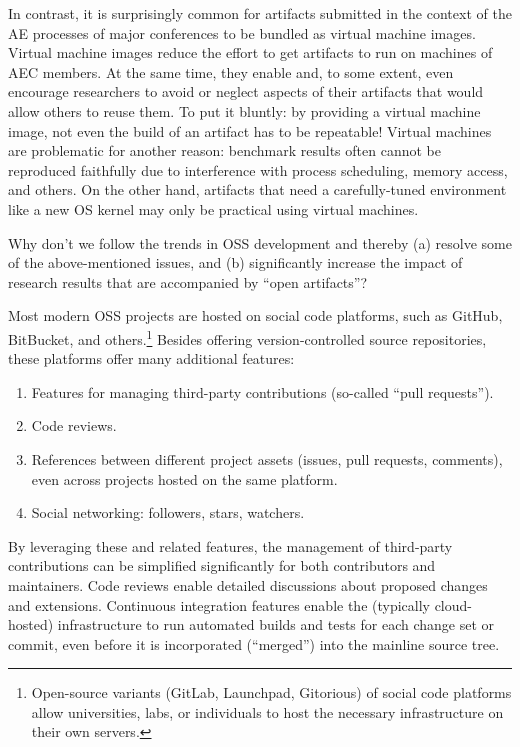 \documentclass{sigplanconf}
\begin{document}
In contrast, it is surprisingly common for artifacts submitted in the context
of the AE processes of major conferences to be bundled as virtual machine
images. Virtual machine images reduce the effort to get artifacts to run on
machines of AEC members. At the same time, they enable and, to some extent,
even encourage researchers to avoid or neglect aspects of their artifacts that
would allow others to reuse them. To put it bluntly: by providing a virtual
machine image, not even the build of an artifact has to be repeatable! Virtual
machines are problematic for another reason: benchmark results often cannot be
reproduced faithfully due to interference with process scheduling, memory
access, and others. On the other hand, artifacts that need a carefully-tuned
environment like a new OS kernel may only be practical using virtual machines.

Why don't we follow the trends in OSS development and thereby (a) resolve some
of the above-mentioned issues, and (b) significantly increase the impact of
research results that are accompanied by ``open artifacts''?

Most modern OSS projects are hosted on social code platforms, such as GitHub,
BitBucket, and others.\footnote{Open-source variants
(GitLab, Launchpad, Gitorious) of social code platforms allow universities,
labs, or individuals to host the necessary infrastructure on their own
servers.} Besides offering version-controlled source repositories, these
platforms offer many additional features:

\begin{enumerate}

\item Features for managing third-party
contributions (so-called ``pull requests'').

\item Code reviews.

\item References between different project assets (issues, pull
requests, comments), even across projects hosted on the same platform.

\item Social networking: followers, stars, watchers.

\end{enumerate}

By leveraging these and related features, the management of third-party
contributions can be simplified significantly for both contributors and
maintainers. Code reviews enable detailed discussions about proposed changes
and extensions. Continuous integration features enable the (typically cloud-hosted)
infrastructure to run automated builds and tests for each change set
or commit, even before it is incorporated (``merged'') into the mainline
source tree.
\end{document}
